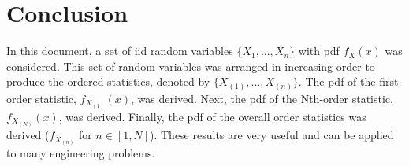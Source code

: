 \documentclass[conference]{IEEEtran}
\begin{document}
%
%
\section{Conclusion}
In this document, a set of iid random variables $\{X_1,...,X_n\}$ with pdf $f_X(x)$ was considered. This set of random variables was arranged in increasing order to produce the ordered statistics, denoted by $\{X_{(1)},...,X_{(n)}\}$. The pdf of the first-order statistic, $f_{X_{(1)}}(x)$, was derived. Next, the pdf of the Nth-order statistic, $f_{X_{(N)}}(x)$, was derived. Finally, the pdf of the overall order statistics was derived ($f_{X_{(n)}}$ for $n\in[1,N]$). These results are very useful and can be applied to many engineering problems.
\end{document}
